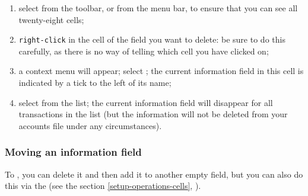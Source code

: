 \begin{enumerate}
	\item select  from the toolbar, or  from the menu bar, to ensure that you can see all twenty-eight cells;
	\item \texttt{right-click} in the cell of the field you want to delete: be sure to do this carefully, as there is no way of telling which cell you have clicked on;
	\item a context menu will appear; select ; the current information field in this cell is indicated by a tick to the left of its name;
	\item select  from the list; the current information field will disappear for all transactions in the list (but the information will not be deleted from your accounts file under any circumstances).
\end{enumerate}


\subsubsection{Moving an information field\label{transactions-list-fields-move}}

To , you can delete it and then add it to another empty field, but you can also do this via the  (see the section \vref{setup-operations-cells}, ).


